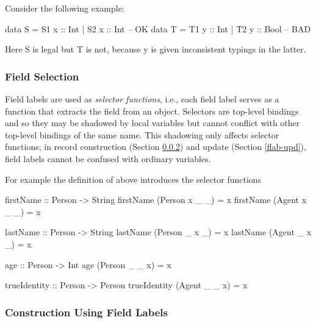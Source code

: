 Consider the following example:
\begin{curry}
data S = S1 { x :: Int } | S2 { x :: Int  } -- OK
data T = T1 { y :: Int } | T2 { y :: Bool } -- BAD
\end{curry}
Here S is legal but T is not, because y is given inconsistent typings in the latter.

\subsubsection{Field Selection}\label{flab-sel}
Field labels are used as \emph{selector functions},
i.e., each field label serves as a function
that extracts the field from an object. Selectors are top-level
bindings and so they may be shadowed by local variables but cannot
conflict with other top-level bindings of the same name.  This
shadowing only affects selector functions; in record construction
(Section \ref{flab-constr}) and update (Section \ref{flab-upd}), field
labels cannot be confused with ordinary variables.


\noindent
For example the definition of  above introduces the selector functions
\begin{curry}
firstName :: Person -> String
firstName (Person x _ _) = x
firstName (Agent  x _ _) = x

lastName :: Person -> String
lastName (Person _ x _) = x
lastName (Agent  _ x _) = x

age :: Person -> Int
age (Person _ _ x) = x

trueIdentity :: Person -> Person
trueIdentity (Agent  _ _ x) = x
\end{curry}

\subsubsection{Construction Using Field Labels}\label{flab-constr}

